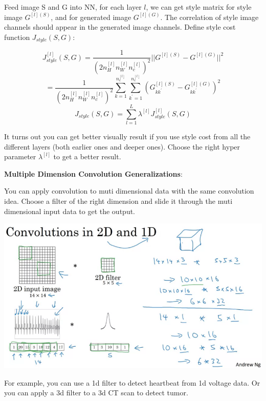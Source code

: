 \documentclass{article}
\begin{document}
\noindent Feed image S and G into NN, for each layer \(l\), we can get style matrix for style image \(G^{[l](S)}\), and for generated image \(G^{[l](G)}\). The correlation of style image channels should appear in the generated image channels. Define style cost function \(J_{style}(S, G)\):

\[J_{style}^{[l]}(S, G) = \frac{1}{(2n_{H}^{[l]}n_{W}^{[l]}n_{c}^{[l]})^{2}} ||G^{[l](S)} - G^{[l](G)}||^{2}\]
\[= \frac{1}{(2n_{H}^{[l]}n_{W}^{[l]}n_{c}^{[l]})^{2}} \sum_{k = 1}^{n_{c}^{[l]}} \sum_{k^{'} = 1}^{n_{c}^{[l]}} (G_{kk^{'}}^{[l](S)} - G_{kk^{'}}^{[l](G)})^{2}\]
\[J_{style}(S, G) = \sum_{l = 1}^{L} \lambda^{[l]} J_{style}^{[l]}(S, G)\]

\noindent It turns out you can get better visually result if you use style cost from all the different layers (both earlier ones and deeper ones). Choose the right hyper parameter \(\lambda^{[l]}\) to get a better result.

\bigskip

\noindent \textbf{Multiple Dimension Convolution Generalizations}:

\noindent You can apply convolution to muti dimensional data with the same convolution idea. Choose a filter of the right dimension and slide it through the muti dimensional input data to get the output.

\begin{center}
\includegraphics[scale=0.4]{./images/conv_1d_2d.png}
\end{center}

\noindent For example, you can use a 1d filter to detect heartbeat from 1d voltage data. Or you can apply a 3d filter to a 3d CT scan to detect tumor.
\end{document}
